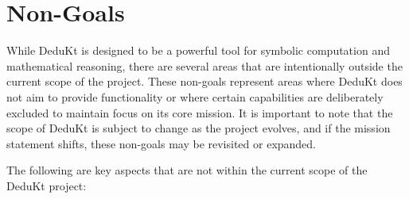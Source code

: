 \section{Non-Goals}\label{sec:non-goals}
While DeduKt is designed to be a powerful tool for symbolic computation and mathematical reasoning, there are several areas that are intentionally outside the current scope of the project.
These non-goals represent areas where DeduKt does not aim to provide functionality or where certain capabilities are deliberately excluded to maintain focus on its core mission.
It is important to note that the scope of DeduKt is subject to change as the project evolves, and if the mission statement shifts, these non-goals may be revisited or expanded.

The following are key aspects that are not within the current scope of the DeduKt project:

